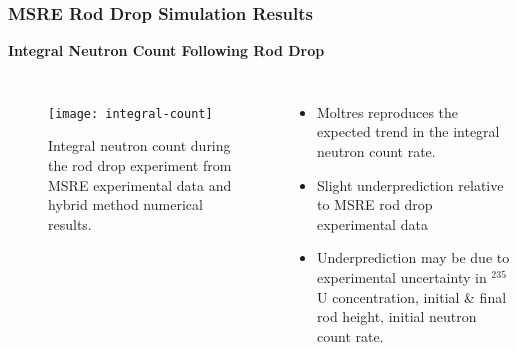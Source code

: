 \begin{frame}
  \frametitle{MSRE Rod Drop Simulation Results}
  \textbf{Integral Neutron Count Following Rod Drop}
  \begin{columns}
    \column{5.5cm}
    \begin{figure}[t]
      \centering
      \texttt{[image: integral-count]}
      \caption{Integral neutron count during the rod drop experiment from \gls{MSRE} experimental data
      and hybrid method numerical results.}
      \label{fig:integral-count}
    \end{figure}
    \column{5.5cm}
    \begin{itemize}
      \item Moltres reproduces the expected trend in the integral neutron count rate.
      \item Slight underprediction relative to MSRE rod drop experimental data
      \item Underprediction may be due to experimental uncertainty in $^{235}$U concentration,
        initial \& final rod height, initial neutron count rate.
    \end{itemize}
  \end{columns}
\end{frame}


